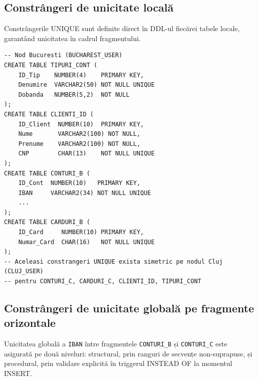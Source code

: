 \documentclass[12pt,a4paper]{article}
\begin{document}
\subsection{Constrângeri de unicitate locală}

Constrângerile UNIQUE sunt definite direct în DDL-ul fiecărei tabele locale, garantând unicitatea
în cadrul fragmentului.

\begin{lstlisting}
-- Nod Bucuresti (BUCHAREST_USER)
CREATE TABLE TIPURI_CONT (
    ID_Tip    NUMBER(4)    PRIMARY KEY,
    Denumire  VARCHAR2(50) NOT NULL UNIQUE
    Dobanda   NUMBER(5,2)  NOT NULL
);
CREATE TABLE CLIENTI_ID (
    ID_Client  NUMBER(10)  PRIMARY KEY,
    Nume       VARCHAR2(100) NOT NULL,
    Prenume    VARCHAR2(100) NOT NULL,
    CNP        CHAR(13)    NOT NULL UNIQUE
);
CREATE TABLE CONTURI_B (
    ID_Cont  NUMBER(10)   PRIMARY KEY,
    IBAN     VARCHAR2(34) NOT NULL UNIQUE
    ...
);
CREATE TABLE CARDURI_B (
    ID_Card     NUMBER(10) PRIMARY KEY,
    Numar_Card  CHAR(16)   NOT NULL UNIQUE
);
-- Aceleasi constrangeri UNIQUE exista simetric pe nodul Cluj (CLUJ_USER)
-- pentru CONTURI_C, CARDURI_C, CLIENTI_ID, TIPURI_CONT
\end{lstlisting}

\subsection{Constrângeri de unicitate globală pe fragmente orizontale}

Unicitatea globală a \texttt{IBAN} între fragmentele \texttt{CONTURI\_B} și \texttt{CONTURI\_C}
este asigurată pe două niveluri: structural, prin ranguri de secvențe non-suprapuse, și
procedural, prin validare explicită în triggerul INSTEAD OF la momentul INSERT.
\end{document}
